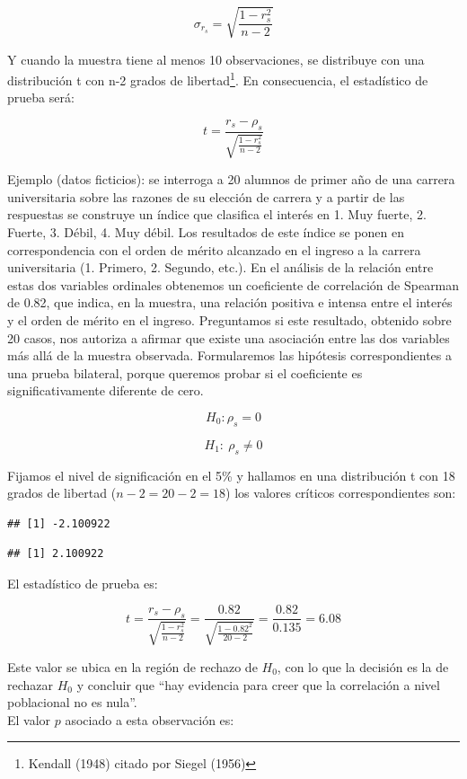 \documentclass[]{book}
\let\rmarkdownfootnote\footnote%
\def\footnote{\protect\rmarkdownfootnote}
\begin{document}
\[\sigma_{r_{s}} = \sqrt{\frac{1 - r_{s}^{2}}{n - 2}}\]

Y cuando la muestra tiene al menos 10 observaciones, se distribuye con
una distribución t con n-2 grados de libertad\footnote{Kendall (1948) citado por Siegel (1956)}. En consecuencia, el
estadístico de prueba será:

\[t = \frac{r_{s} - \rho_{s}}{\sqrt{\frac{1 - r_{s}^{2}}{n - 2}}}\]

Ejemplo (datos ficticios): se interroga a 20 alumnos de primer año de
una carrera universitaria sobre las razones de su elección de carrera y
a partir de las respuestas se construye un índice que clasifica el
interés en 1. Muy fuerte, 2. Fuerte, 3. Débil, 4. Muy débil. Los
resultados de este índice se ponen en correspondencia con el orden de
mérito alcanzado en el ingreso a la carrera universitaria (1. Primero,
2. Segundo, etc.). En el análisis de la relación entre estas dos
variables ordinales obtenemos un coeficiente de correlación de Spearman
de 0.82, que indica, en la muestra, una relación positiva e intensa
entre el interés y el orden de mérito en el ingreso. Preguntamos si este
resultado, obtenido sobre 20 casos, nos autoriza a afirmar que existe
una asociación entre las dos variables más allá de la muestra observada.
Formularemos las hipótesis correspondientes a una prueba bilateral,
porque queremos probar si el coeficiente es significativamente diferente
de cero.

\[H_{0}: \rho_{s} = 0\]

\[H_{1}:\ \rho_{s} \neq 0\]

Fijamos el nivel de significación en el 5\% y hallamos en una
distribución t con 18 grados de libertad (\(n - 2 = 20 - 2 = 18\)) los
valores críticos correspondientes son:

\begin{verbatim}
## [1] -2.100922
\end{verbatim}

\begin{verbatim}
## [1] 2.100922
\end{verbatim}

El estadístico de prueba es:

\[t = \frac{r_{s} - \rho_{s}}{\sqrt{\frac{1 - r_{s}^{2}}{n - 2}}} = \frac{0.82}{\sqrt{\frac{1 - {0.82}^{2}}{20 - 2}}} = \frac{0.82}{0.135} = 6.08\]

Este valor se ubica en la región de rechazo de \(H_0\), con lo que la
decisión es la de rechazar \(H_0\) y concluir que ``hay evidencia para creer que la correlación a nivel poblacional no es nula''.\\
El valor \(p\) asociado a esta observación es:
\end{document}

